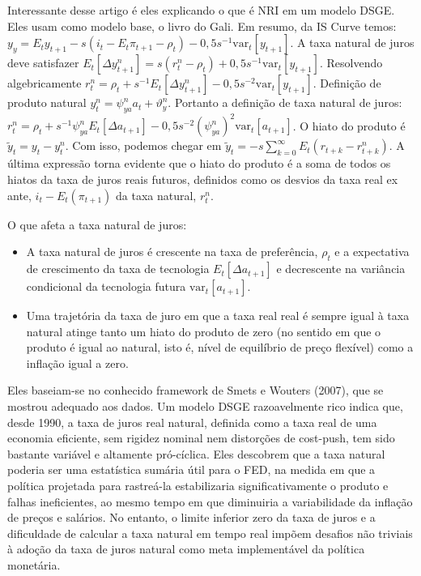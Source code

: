 \documentclass[11pt,oneside,a4paper]{article}
\begin{document}
Interessante desse artigo é eles explicando o que é NRI em um modelo DSGE. Eles usam como modelo base, o livro do Gali. Em resumo, da IS Curve temos: $y_y = E_t y_{t+1} - s(i_t - E_t \pi_{t+1} - \rho_t ) - 0,5 s^{-1}\text{var}_t[y_{t+1}] $. A taxa natural de juros deve satisfazer $E_t[\Delta y_{t+1}^{n}] = s(r_t^{n} - \rho_t) + 0,5s^{-1}\text{var}_t[y_{t+1}] $. Resolvendo algebricamente $r_t^{n} = \rho_t + s^{-1}E_t[\Delta y_{t+1}^{n}] - 0,5s^{-2}\text{var}_t[y_{t+1}]$. Definição de produto natural $y_t^{n} = \psi_{ya}^{n}a_t + \vartheta_y^{n} $. Portanto a definição de taxa natural de juros: $r_t^{n} = \rho_t + s^{-1}\psi_{ya}^{n} E_t[\Delta a_{t+1}] - 0,5s^{-2}(\psi_{ya}^{n})^{2}\text{var}_t[a_{t+1}]$. O hiato do produto é $\tilde{y}_t = y_t - y_t^{n} $. Com isso, podemos chegar em $\tilde{y}_t = -s \sum_{k=0}^{\infty} E_t(r_{t+k} - r_{t+k}^{n}) $. A última expressão torna evidente que o hiato do produto é a soma de todos os hiatos da taxa de juros reais futuros, definidos como os desvios da taxa real ex ante, $i_t - E_t(\pi_{t+1})$ da taxa natural, $r_{t}^{n} $.

O que afeta a taxa natural de juros:
\begin{itemize}
    \item A taxa natural de juros é crescente na taxa de preferência, $\rho_t$ e a expectativa de crescimento da taxa de tecnologia $E_t[\Delta a_{t+1}] $ e decrescente na variância condicional da tecnologia futura $\text{var}_t[a_{t+1}] $.
    \item Uma trajetória da taxa de juro em que a taxa real real é sempre igual à taxa natural atinge tanto um hiato do produto de zero (no sentido em que o produto é igual ao natural, isto é, nível de equilíbrio de preço flexível) como a inflação igual a zero.
\end{itemize}

Eles baseiam-se no conhecido framework de Smets e Wouters (2007), que se mostrou adequado aos dados. Um modelo DSGE razoavelmente rico indica que, desde 1990, a taxa de juros real natural, definida como a taxa real de uma economia eficiente, sem rigidez nominal nem distorções de cost-push, tem sido bastante variável e altamente pró-cíclica. Eles descobrem que a taxa natural poderia ser uma estatística sumária útil para o FED, na medida em que a política projetada para rastreá-la estabilizaria significativamente o produto e falhas ineficientes, ao mesmo tempo em que diminuiria a variabilidade da inflação de preços e salários. No entanto, o limite inferior zero da taxa de juros e a dificuldade de calcular a taxa natural em tempo real impõem desafios não triviais à adoção da taxa de juros natural como meta implementável da política monetária.
\end{document}
